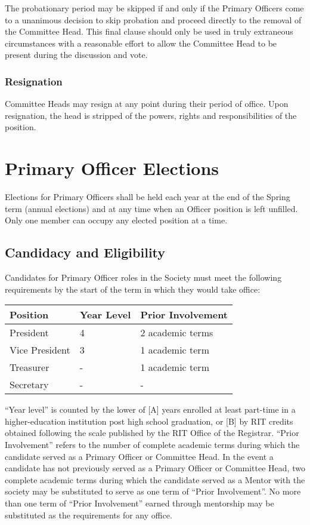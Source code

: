 \documentclass[american]{article}
\begin{document}
The probationary period may be skipped if and only if the Primary Officers come to a unanimous decision to skip probation and proceed directly to the removal of the Committee Head. This final clause should only be used in truly extraneous circumstances with a reasonable effort to allow the Committee Head to be present during the discussion and vote.

\subsubsection{Resignation}
Committee Heads may resign at any point during their period of office. Upon resignation, the head is stripped of the powers, rights and responsibilities of the position.

\section{Primary Officer Elections}
Elections for Primary Officers shall be held each year at the end of the Spring term (annual elections) and at any time when an Officer position is left unfilled. Only one member can occupy any elected position at a time.

\subsection{Candidacy and Eligibility}
Candidates for Primary Officer roles in the Society must meet the following requirements by the start of the term in which they would take office:

\begin{table}[h]
\centering
\begin{tabular}{|l|l|l|}
\hline
\textbf{Position} & \textbf{Year Level} & \textbf{Prior Involvement} \\ \hline
President & 4 & 2 academic terms \\ \hline
Vice President & 3 & 1 academic term \\ \hline
Treasurer & - & 1 academic term \\ \hline
Secretary & - & - \\ \hline
\end{tabular}
\end{table}

“Year level” is counted by the lower of [A] years enrolled at least part-time in a higher-education institution post high school graduation, or [B] by RIT credits obtained following the scale published by the RIT Office of the Registrar. “Prior Involvement” refers to the number of complete academic terms during which the candidate served as a Primary Officer or Committee Head. In the event a candidate has not previously served as a Primary Officer or Committee Head, two complete academic terms during which the candidate served as a Mentor with the society may be substituted to serve as one term of “Prior Involvement”. No more than one term of “Prior Involvement” earned through mentorship may be substituted as the requirements for any office.
\end{document}
